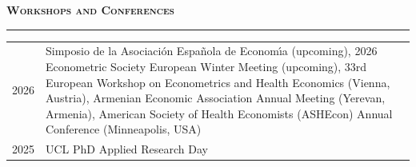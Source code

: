 \documentclass[11pt]{article}
\begin{document}
\noindent\large{\textbf{\textsc{Workshops and Conferences}}}
\vspace{0.2em}
\hrule 
\normalsize
\noindent \begin{tabular}{ p{2cm} p{13.6cm}}
2026            & Simposio de la Asociaci\'on Espa\~nola de Econom\'{\i}a (upcoming), 2026 Econometric Society European Winter Meeting (upcoming), 33rd European Workshop on Econometrics and Health Economics (Vienna, Austria), Armenian Economic Association Annual Meeting (Yerevan, Armenia), American Society of Health Economists (ASHEcon) Annual Conference (Minneapolis, USA) \\
2025            & UCL PhD Applied Research Day \\
\end{tabular}
\vspace{0.6em}


 
\end{document}
